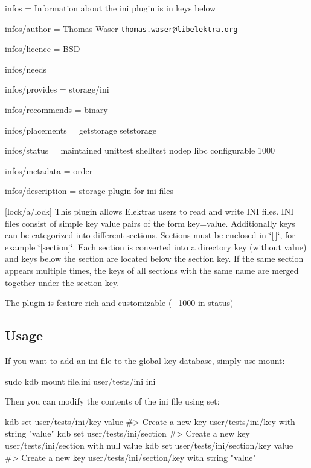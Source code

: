 
\begin{DoxyItemize}
\item infos = Information about the ini plugin is in keys below
\item infos/author = Thomas Waser \href{mailto:thomas.waser@libelektra.org}{\tt thomas.\+waser@libelektra.\+org}
\item infos/licence = B\+SD
\item infos/needs =
\item infos/provides = storage/ini
\item infos/recommends = binary
\item infos/placements = getstorage setstorage
\item infos/status = maintained unittest shelltest nodep libc configurable 1000
\item infos/metadata = order
\item infos/description = storage plugin for ini files
\end{DoxyItemize}

\mbox{[}lock/a/lock\mbox{]} This plugin allows Elektra\textquotesingle{}s users to read and write I\+NI files. I\+NI files consist of simple key value pairs of the form {\ttfamily key=value}. Additionally keys can be categorized into different sections. Sections must be enclosed in \char`\"{}\mbox{[}$\,$\mbox{]}\char`\"{}, for example \char`\"{}\mbox{[}section\mbox{]}\char`\"{}. Each section is converted into a directory key (without value) and keys below the section are located below the section key. If the same section appears multiple times, the keys of all sections with the same name are merged together under the section key.

The plugin is feature rich and customizable (+1000 in status)

\subsection*{Usage}

If you want to add an ini file to the global key database, simply use mount\+:


\begin{DoxyCode}
sudo kdb mount file.ini user/tests/ini ini
\end{DoxyCode}


Then you can modify the contents of the ini file using set\+:


\begin{DoxyCode}
kdb set user/tests/ini/key value
#> Create a new key user/tests/ini/key with string "value"
kdb set user/tests/ini/section
#> Create a new key user/tests/ini/section with null value
kdb set user/tests/ini/section/key value
#> Create a new key user/tests/ini/section/key with string "value"
\end{DoxyCode}


